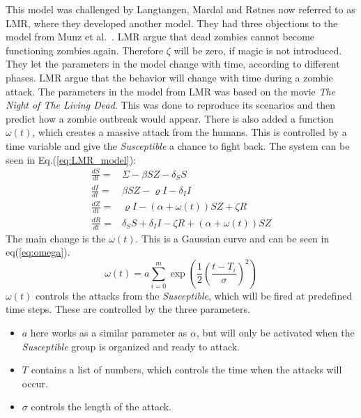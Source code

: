 \documentclass[%
twoside,                 %
final,                   %
chapterprefix=true,      %
open=right               %
10pt]{book}
\begin{document}
This model was challenged by Langtangen, Mardal and Røtnes \cite{zombie-math} now referred to as LMR, where they developed another model. They had three objections to the model from Munz et al.~\cite{munz2009zombies}. LMR argue that dead zombies cannot become functioning zombies again. Therefore $\zeta$ will be zero, if magic is not introduced. They let the parameters in the model change with time, according to different phases. LMR argue that the behavior will change with time during a zombie attack. The parameters in the model from LMR was based on the movie \emph{The Night of The Living Dead}. This was done to reproduce its scenarios and then predict how a zombie outbreak would appear. There is also added a function $\omega(t)$, which creates a massive attack from the humans. This is controlled by a time variable and give the \emph{Susceptible} a chance to fight back. The system can be seen in Eq.(\ref{eq:LMR_model}):
\begin{equation} \label{eq:LMR_model}
	\begin{aligned} 
	\frac{dS}{dt} =& \Sigma -\beta SZ - \delta_SS \\
	\frac{dI}{dt} =& \beta SZ - \varrho I - \delta_II\\
	\frac{dZ}{dt} =& \varrho I- (\alpha+\omega(t))SZ + \zeta R\\
	\frac{dR}{dt} =& \delta_SS +\delta_II -\zeta R + (\alpha+\omega(t))SZ 
	\end{aligned}
\end{equation}
The main change is the $\omega(t)$. This is a Gaussian curve and can be seen in eq(\ref{eq:omega}).
\begin{equation} \label{eq:omega}
\omega(t) = a \sum^m_{i=0}\exp\left(\frac{1}{2}\left(\frac{t-T_i}{\sigma}\right)^2\right)
\end{equation}
$\omega(t)$ controls the attacks from the \emph{Susceptible}, which will be fired at predefined time steps. These are controlled by the three parameters. 
\begin{itemize}
\item $a$ here works as a similar parameter as $\alpha$, but will only be activated when the \emph{Susceptible} group is organized and ready to attack. 

\item $T$ contains a list of numbers, which controls the time when the attacks will occur.

\item $\sigma$ controls the length of the attack. 
\end{itemize}
\end{document}
